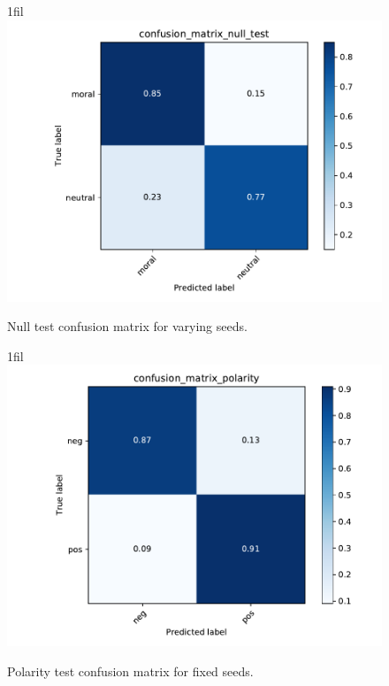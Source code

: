 \documentclass{article}
\makeatletter
\newcommand*{\centerfloat}{%
  \parindent \z@
  \leftskip \z@ \@plus 1fil \@minus \textwidth
  \rightskip\leftskip
  \parfillskip \z@skip}
\makeatother
\begin{document}
\begin{figure}[H]
    \centerfloat
    \includegraphics[width=1.5\linewidth]{confusion-matrix-centroid-varying-seeds/confusion_matrix_null_test.pdf}
    \caption{Null test confusion matrix for varying seeds.}
    \label{fig:confusion-null-varying}
\end{figure}

\begin{figure}[H]
    \centerfloat
    \includegraphics[width=1.5\linewidth]{confusion-matrix-centroid-fixed-seeds/confusion_matrix_polarity.pdf}
    \caption{Polarity test confusion matrix for fixed seeds.}
    \label{fig:confusion-polarity-fixed}
\end{figure}
\end{document}
